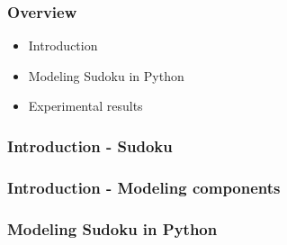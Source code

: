 \documentclass{beamer}
\title{\talktitle}
\author{\Us}
\date{\talkdate}
\begin{document}
\begin{frame}
  \titlepage
  \conferencebanner
\end{frame}

\begin{frame}
  \frametitle{Overview}

  \begin{itemize}
  \item<1-> Introduction
  \item<2-> Modeling Sudoku in Python
  \item<3-> Experimental results      
  \end{itemize}
\end{frame}

\begin{frame}
 \frametitle{Introduction - Sudoku}
 
 \sudokuexampleone
\end{frame}

\begin{frame}
 \frametitle{Introduction - Modeling components}
 
 \librarytable
\end{frame}

\begin{frame}[fragile]
 \frametitle{Modeling Sudoku in Python}
 
 
\end{frame}
\end{document}
